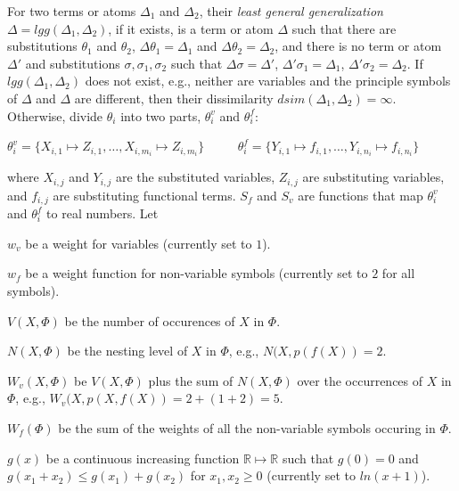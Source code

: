 \documentclass[EPiC]{easychair}
\newenvironment{packed_itemize}{
\vspace*{-0.5em}
\begin{itemize}
  \setlength{\partopsep}{0pt}
  \setlength{\itemsep}{1pt}
  \setlength{\parskip}{0pt}
  \setlength{\parsep}{0pt}
}{\end{itemize}}
\begin{document}
For two terms or atoms $\Delta_1$ and $\Delta_2$, their \emph{least general 
generalization} $\Delta = lgg(\Delta_1,\Delta_2)$, if it exists, is a term 
or atom $\Delta$ such that there are substitutions $\theta_1$ and $\theta_2$, 
$\Delta\theta_1 = \Delta_1$ and $\Delta\theta_2 = \Delta_2$, and 
there is no term or atom $\Delta'$ and substitutions 
$\sigma, \sigma_1, \sigma_2$ such that 
$\Delta\sigma = \Delta'$, $\Delta'\sigma_1 = \Delta_1$, 
$\Delta'\sigma_2 = \Delta_2$.
If $lgg(\Delta_1,\Delta_2)$ does not exist, e.g., neither are variables and 
the principle symbols of $\Delta$ and $\Delta$ are different, then their 
dissimilarity $dsim(\Delta_1,\Delta_2) = \infty$.
Otherwise, divide $\theta_i$ into two parts, $\theta_i^v$ and $\theta_i^f$:
\begin{center}
$\theta_i^v=\{X_{i,1}\mapsto Z_{i,1},\dots,X_{i,m_i}\mapsto Z_{i,m_i}\}$
~~~~
$\theta_i^f=\{Y_{i,1}\mapsto f_{i,1},\dots,Y_{i,n_i}\mapsto f_{i,n_i}\}$
\end{center}
where $X_{i,j}$ and $Y_{i,j}$ are the substituted variables, 
$Z_{i,j}$ are substituting variables, and
$f_{i,j}$ are substituting functional terms.
$S_f$ and $S_v$ are functions that map $\theta_i^v$ and 
$\theta_i^f$ to real numbers.
Let
\begin{packed_itemize}
\item $w_v$ be a weight for variables (currently set to $1$).
\item $w_f$ be a weight function for non-variable symbols (currently
      set to $2$ for all symbols). 
\item $V(X,\Phi)$ be the number of occurences of $X$ in $\Phi$.
\item $N(X,\Phi)$ be the nesting level of $X$ in $\Phi$, e.g., 
      $N(X,p(f(X)) = 2$.
\item $W_v(X,\Phi)$ be $V(X,\Phi)$ plus the sum of $N(X,\Phi)$ over the 
      occurrences of $X$ in $\Phi$, e.g., 
      $W_v(X,p(X,f(X)) = 2 + (1+2) = 5$.
\item $W_f(\Phi)$ be the sum of the weights of all the non-variable symbols 
      occuring in $\Phi$.
\item $g(x)$ be a continuous increasing function 
      $\mathbb{R} \mapsto \mathbb{R}$ such that 
      $g(0)=0$
      and
      $g(x_1+x_2) \leq g(x_1)+ g(x_2)$ for $x_1, x_2\geq0$
      (currently set to $ln(x+1)$).
\end{packed_itemize}
\end{document}

